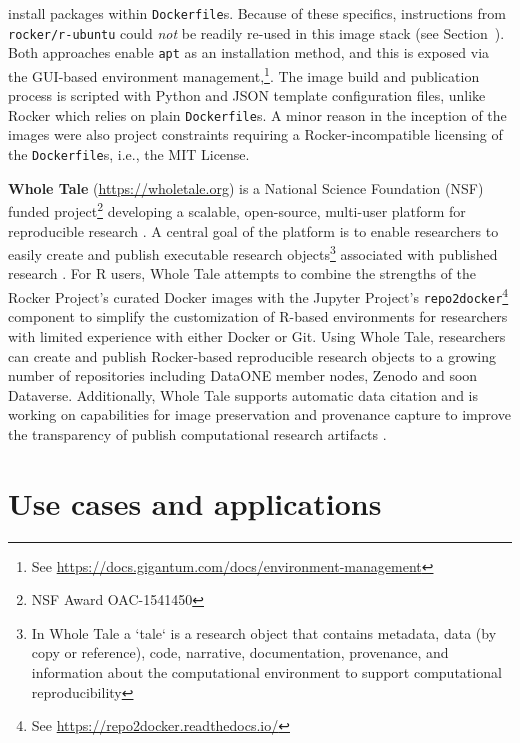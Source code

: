 install packages within \texttt{Dockerfile}s. Because of these
specifics, instructions from \texttt{rocker/r-ubuntu} could \emph{not}
be readily re-used in this image stack (see
Section~). Both approaches enable \texttt{apt} as an
installation method, and this is exposed via the GUI-based environment
management,\footnote{See \href{https://docs.gigantum.com/docs/environment-management}{https://docs.gigantum.com/docs/environment-management}}.
The image build and publication process is scripted with Python and JSON
template configuration files, unlike Rocker which relies on plain
\texttt{Dockerfile}s. A minor reason in the inception of the images were
also project constraints requiring a Rocker-incompatible licensing of
the \texttt{Dockerfile}s, i.e., the MIT License.

\textbf{Whole Tale} (\url{https://wholetale.org}) is a National Science
Foundation (NSF) funded project\footnote{NSF Award OAC-1541450}
developing a scalable, open-source, multi-user platform for reproducible
research \citep{brinckman2019, chard2019a}. A central goal of the
platform is to enable researchers to easily create and publish
executable research
objects\footnote{In Whole Tale a `tale` is a research object that contains metadata, data (by copy or reference), code, narrative, documentation, provenance, and information about the computational environment to support computational reproducibility}
associated with published research \citep{chard2019b}. For R users,
Whole Tale attempts to combine the strengths of the Rocker Project's
curated Docker images with the Jupyter Project's
\texttt{repo2docker}\footnote{See \href{https://repo2docker.readthedocs.io/}{https://repo2docker.readthedocs.io/}}
component to simplify the customization of R-based environments for
researchers with limited experience with either Docker or Git. Using
Whole Tale, researchers can create and publish Rocker-based reproducible
research objects to a growing number of repositories including DataONE
member nodes, Zenodo and soon Dataverse. Additionally, Whole Tale
supports automatic data citation and is working on capabilities for
image preservation and provenance capture to improve the transparency of
publish computational research artifacts
\citep{mecum2018, mcphillips2019}.

\hypertarget{use-cases-and-applications}{%
\section{Use cases and applications}\label{use-cases-and-applications}}

